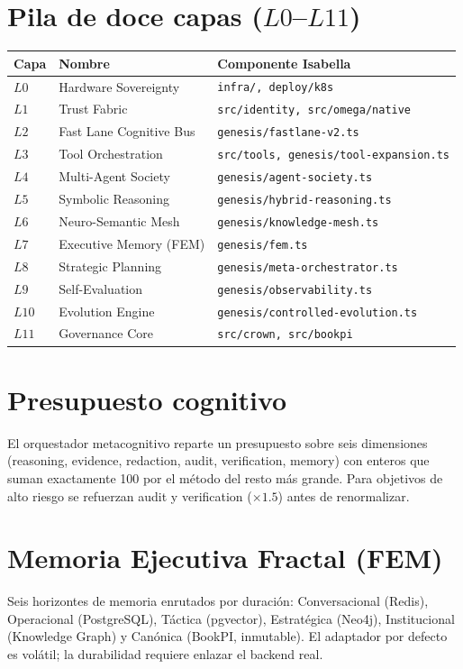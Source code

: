 \documentclass[11pt,a4paper]{article}
\begin{document}
\section{Pila de doce capas (\(L0\)--\(L11\))}
\begin{center}
\begin{tabular}{@{}lll@{}}
\toprule
\textbf{Capa} & \textbf{Nombre} & \textbf{Componente Isabella} \\
\midrule
\(L0\) & Hardware Sovereignty & \texttt{infra/, deploy/k8s} \\
\(L1\) & Trust Fabric & \texttt{src/identity, src/omega/native} \\
\(L2\) & Fast Lane Cognitive Bus & \texttt{genesis/fastlane-v2.ts} \\
\(L3\) & Tool Orchestration & \texttt{src/tools, genesis/tool-expansion.ts} \\
\(L4\) & Multi-Agent Society & \texttt{genesis/agent-society.ts} \\
\(L5\) & Symbolic Reasoning & \texttt{genesis/hybrid-reasoning.ts} \\
\(L6\) & Neuro-Semantic Mesh & \texttt{genesis/knowledge-mesh.ts} \\
\(L7\) & Executive Memory (FEM) & \texttt{genesis/fem.ts} \\
\(L8\) & Strategic Planning & \texttt{genesis/meta-orchestrator.ts} \\
\(L9\) & Self-Evaluation & \texttt{genesis/observability.ts} \\
\(L10\) & Evolution Engine & \texttt{genesis/controlled-evolution.ts} \\
\(L11\) & Governance Core & \texttt{src/crown, src/bookpi} \\
\bottomrule
\end{tabular}
\end{center}

\section{Presupuesto cognitivo}
El orquestador metacognitivo reparte un presupuesto sobre seis dimensiones
(reasoning, evidence, redaction, audit, verification, memory) con enteros que suman
exactamente 100 por el método del resto más grande. Para objetivos de alto riesgo se
refuerzan audit y verification (\(\times 1.5\)) antes de renormalizar.

\section{Memoria Ejecutiva Fractal (FEM)}
Seis horizontes de memoria enrutados por duración: Conversacional (Redis), Operacional
(PostgreSQL), Táctica (pgvector), Estratégica (Neo4j), Institucional (Knowledge Graph) y
Canónica (BookPI, inmutable). El adaptador por defecto es volátil; la durabilidad requiere
enlazar el backend real.
\end{document}
